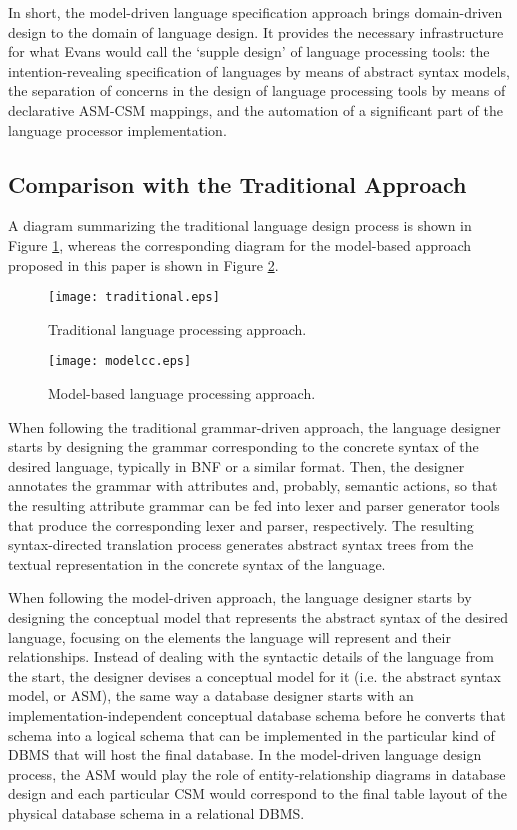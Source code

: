 \documentclass[preprint]{elsarticle}
\begin{document}
In short, the model-driven language specification approach brings domain-driven design \cite{ddd} to the domain of language design.
It provides the necessary infrastructure for what Evans would call the `supple design' of language processing tools: the intention-revealing specification of languages by means of abstract syntax models, the separation of concerns in the design of language processing tools by means of declarative ASM-CSM mappings, and the automation of a significant part of the language processor implementation.

\subsection{Comparison with the Traditional Approach} \label{subsec:comparison}

A diagram summarizing the traditional language design process is shown in Figure \ref{fig:traditional}, whereas the corresponding diagram for
the model-based approach proposed in this paper is shown in Figure \ref{fig:ModelCC}.

\begin{figure}[tb!]
\centering
\texttt{[image: traditional.eps]}
\caption{Traditional language processing approach.} \label{fig:traditional}
\end{figure}

\begin{figure}[tb!]
\centering
\texttt{[image: modelcc.eps]}
\caption{Model-based language processing approach.} \label{fig:ModelCC}
\end{figure}

When following the traditional grammar-driven approach, the language designer starts by designing the grammar corresponding to the concrete syntax of the desired language, typically in BNF or a similar format.
Then, the designer annotates the grammar with attributes and, probably, semantic actions, so that the resulting attribute grammar can be fed into lexer and parser generator tools that produce the corresponding lexer and parser, respectively.
The resulting syntax-directed translation process generates abstract syntax trees from the textual representation in the concrete syntax of the language.

When following the model-driven approach, the language designer starts by designing the conceptual model that represents the abstract syntax of the desired language, focusing on the elements the language will represent and their relationships.
Instead of dealing with the syntactic details of the language from the start, the designer devises a conceptual model for it (i.e. the abstract syntax model, or ASM), the same way a database designer starts with an implementation-independent conceptual database schema before he converts that schema into a logical schema that can be implemented in the particular kind of DBMS that will host the final database.
In the model-driven language design process, the ASM would play the role of entity-relationship diagrams in database design and each particular CSM would correspond to the final table layout of the physical database schema in a relational DBMS.
\end{document}
